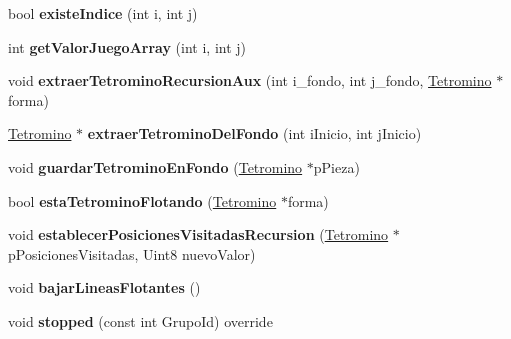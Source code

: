 \begin{DoxyCompactItemize}
\item 
bool {\bfseries existe\+Indice} (int i, int j)\hypertarget{class_tetris_juego_aa8ee8bc48fbef8331a88bb3c8d26f64e}{}\label{class_tetris_juego_aa8ee8bc48fbef8331a88bb3c8d26f64e}

\item 
int {\bfseries get\+Valor\+Juego\+Array} (int i, int j)\hypertarget{class_tetris_juego_a4421b3f0e7acb18053022c08eeab56d7}{}\label{class_tetris_juego_a4421b3f0e7acb18053022c08eeab56d7}

\item 
void {\bfseries extraer\+Tetromino\+Recursion\+Aux} (int i\+\_\+fondo, int j\+\_\+fondo, \hyperlink{class_tetromino}{Tetromino} $\ast$forma)\hypertarget{class_tetris_juego_a78e144080ad1951a7660b1a48864397f}{}\label{class_tetris_juego_a78e144080ad1951a7660b1a48864397f}

\item 
\hyperlink{class_tetromino}{Tetromino} $\ast$ {\bfseries extraer\+Tetromino\+Del\+Fondo} (int i\+Inicio, int j\+Inicio)\hypertarget{class_tetris_juego_afe912d0938be0df16ef73b265924e110}{}\label{class_tetris_juego_afe912d0938be0df16ef73b265924e110}

\item 
void {\bfseries guardar\+Tetromino\+En\+Fondo} (\hyperlink{class_tetromino}{Tetromino} $\ast$p\+Pieza)\hypertarget{class_tetris_juego_aae0c1e596d5a512a326f37ce9b1b628e}{}\label{class_tetris_juego_aae0c1e596d5a512a326f37ce9b1b628e}

\item 
bool {\bfseries esta\+Tetromino\+Flotando} (\hyperlink{class_tetromino}{Tetromino} $\ast$forma)\hypertarget{class_tetris_juego_a6d4c93c87e6d5745db881832342d0931}{}\label{class_tetris_juego_a6d4c93c87e6d5745db881832342d0931}

\item 
void {\bfseries establecer\+Posiciones\+Visitadas\+Recursion} (\hyperlink{class_tetromino}{Tetromino} $\ast$p\+Posiciones\+Visitadas, Uint8 nuevo\+Valor)\hypertarget{class_tetris_juego_afbb2405fc5ea8e4fc907d7cd978f05cd}{}\label{class_tetris_juego_afbb2405fc5ea8e4fc907d7cd978f05cd}

\item 
void {\bfseries bajar\+Lineas\+Flotantes} ()\hypertarget{class_tetris_juego_a252b73086f8a71530f98b13de2b58ecd}{}\label{class_tetris_juego_a252b73086f8a71530f98b13de2b58ecd}

\item 
void {\bfseries stopped} (const int Grupo\+Id) override\hypertarget{class_tetris_juego_a1b703d62e28f6885428dae36a515cacf}{}\label{class_tetris_juego_a1b703d62e28f6885428dae36a515cacf}


\end{DoxyCompactItemize}
